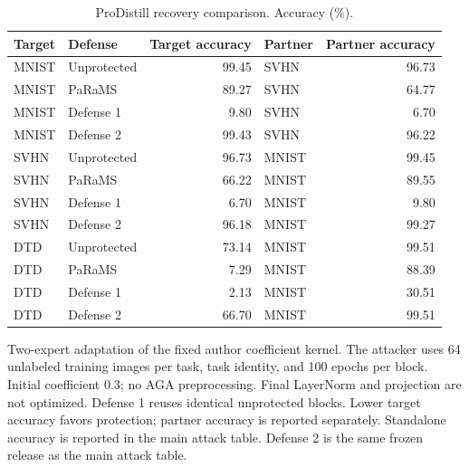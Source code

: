 \begin{table}[t]
\centering\small
\setlength{\tabcolsep}{4pt}
\caption{ProDistill recovery comparison. Accuracy (\%).}
\label{tab:feature_distillation}
\begin{tabular}{@{}llrlr@{}}
\toprule
Target & Defense & Target accuracy & Partner & Partner accuracy \\
\midrule
MNIST & Unprotected & 99.45 & SVHN & 96.73 \\
MNIST & PaRaMS & 89.27 & SVHN & 64.77 \\
MNIST & Defense 1 & 9.80 & SVHN & 6.70 \\
MNIST & Defense 2 & 99.43 & SVHN & 96.22 \\
\midrule
SVHN & Unprotected & 96.73 & MNIST & 99.45 \\
SVHN & PaRaMS & 66.22 & MNIST & 89.55 \\
SVHN & Defense 1 & 6.70 & MNIST & 9.80 \\
SVHN & Defense 2 & 96.18 & MNIST & 99.27 \\
\midrule
DTD & Unprotected & 73.14 & MNIST & 99.51 \\
DTD & PaRaMS & 7.29 & MNIST & 88.39 \\
DTD & Defense 1 & 2.13 & MNIST & 30.51 \\
DTD & Defense 2 & 66.70 & MNIST & 99.51 \\
\bottomrule
\end{tabular}
\par\smallskip
\begin{minipage}{\textwidth}\footnotesize Two-expert adaptation of the fixed author coefficient kernel. The attacker uses 64 unlabeled training images per task, task identity, and 100 epochs per block. Initial coefficient 0.3; no AGA preprocessing. Final LayerNorm and projection are not optimized. Defense 1 reuses identical unprotected blocks. Lower target accuracy favors protection; partner accuracy is reported separately. Standalone accuracy is reported in the main attack table. Defense 2 is the same frozen release as the main attack table.\end{minipage}
\end{table}

